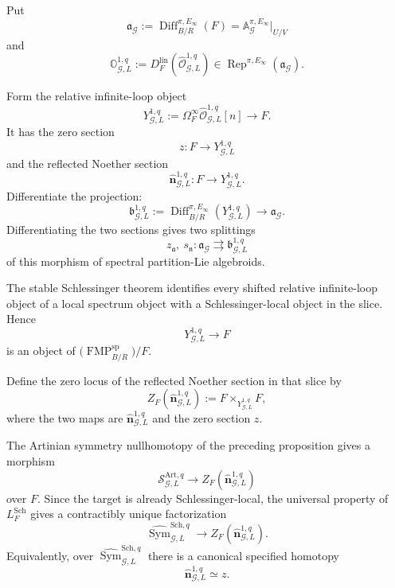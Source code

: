 \begin{definition}
\label{def:symmetry-noether-differentiated-noether-representation}
Put
\[
\mathfrak a_{\mathcal G}
:=
\operatorname{Diff}^{\pi,E_\infty}_{B/R}(F)
=
\mathbb A_{\mathcal G}^{\pi,E_\infty}|_{U/V}
\]
and
\[
\boxed{
\mathbb O_{\mathcal G,L}^{1,q}
:=
D_F^{\mathrm{lin}}
\left(
\widehat{\mathcal O}_{\mathcal G,L}^{1,q}
\right)
\in
\operatorname{Rep}^{\pi,E_\infty}(\mathfrak a_{\mathcal G}).
}
\]
\end{definition}

\begin{construction}
\label{constr:symmetry-noether-retractive-algebroid-of-the-reflected-noether-coefficient}
Form the relative infinite-loop object
\[
Y_{\mathcal G,L}^{1,q}
:=
\Omega_F^\infty
\widehat{\mathcal O}_{\mathcal G,L}^{1,q}[n]
\longrightarrow
F.
\]
It has the zero section
\[
z:F\longrightarrow Y_{\mathcal G,L}^{1,q}
\]
and the reflected Noether section
\[
\widehat{\mathbf n}_{\mathcal G,L}^{1,q}:
F\longrightarrow Y_{\mathcal G,L}^{1,q}.
\]
Differentiate the projection:
\[
\mathfrak b_{\mathcal G,L}^{1,q}
:=
\operatorname{Diff}^{\pi,E_\infty}_{B/R}
\left(
Y_{\mathcal G,L}^{1,q}
\right)
\longrightarrow
\mathfrak a_{\mathcal G}.
\]
Differentiating the two sections gives two splittings
\[
z_{\mathfrak a},\ s_{\mathfrak n}:
\mathfrak a_{\mathcal G}
\rightrightarrows
\mathfrak b_{\mathcal G,L}^{1,q}
\]
of this morphism of spectral partition-Lie algebroids.
\end{construction}

\begin{construction}
\label{constr:symmetry-noether-reflected-symmetry-zero-locus-and-universal-section-homotopy}
The stable Schlessinger theorem identifies every shifted relative infinite-loop
object of a local spectrum object with a Schlessinger-local object in the slice.
Hence
\[
Y_{\mathcal G,L}^{1,q}\longrightarrow F
\]
is an object of
$\bigl(\operatorname{FMP}^{\mathrm{sp}}_{B/R}\bigr)/F$.

Define the zero locus of the reflected Noether section in that slice by
\[
Z_F\!\left(\widehat{\mathbf n}_{\mathcal G,L}^{1,q}\right)
:=
F
\times_{Y_{\mathcal G,L}^{1,q}}
F,
\]
where the two maps are
$\widehat{\mathbf n}_{\mathcal G,L}^{1,q}$ and the zero section $z$.

The Artinian symmetry nullhomotopy of the preceding proposition gives a morphism
\[
\mathcal S_{\mathcal G,L}^{\mathrm{Art},q}
\longrightarrow
Z_F\!\left(\widehat{\mathbf n}_{\mathcal G,L}^{1,q}\right)
\]
over $F$.  Since the target is already Schlessinger-local, the universal property
of $L_F^{\mathrm{Sch}}$ gives a contractibly unique factorization
\[
\boxed{
\widehat{\operatorname{Sym}}_{\mathcal G,L}^{\mathrm{Sch},q}
\longrightarrow
Z_F\!\left(\widehat{\mathbf n}_{\mathcal G,L}^{1,q}\right).
}
\]
Equivalently, over
$\widehat{\operatorname{Sym}}_{\mathcal G,L}^{\mathrm{Sch},q}$ there is a
canonical specified homotopy
\[
\boxed{
\widehat{\mathbf n}_{\mathcal G,L}^{1,q}\simeq z.
}
\]
\end{construction}

